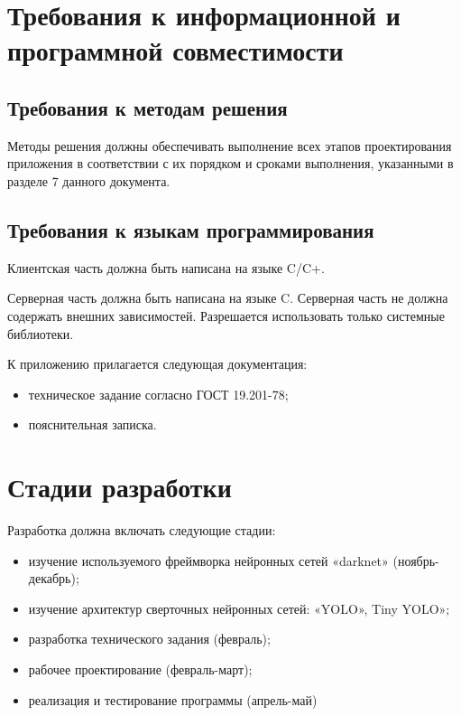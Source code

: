 \documentclass[a4paper,english]{G2-105}
\begin{document}
\section{Требования к информационной и программной совместимости}\ttl \ttl
\subsection{Требования к методам решения} \ttl
\par Методы решения должны обеспечивать выполнение всех этапов проектирования приложения в соответствии с их порядком и сроками выполнения, указанными в разделе 7 данного документа.
\ttl 
\subsection{Требования к языкам программирования} \ttl
\par Клиентская часть должна быть написана на языке C/C+.
\par Серверная часть должна быть написана на языке C. Серверная часть не должна содержать внешних зависимостей. Разрешается использовать только системные библиотеки.

\par К приложению прилагается следующая документация:
\begin{itemize}
\item техническое задание согласно ГОСТ 19.201-78;
\item пояснительная записка.
\end{itemize}
\ttl \ttl \ttl
{} \ttl \ttl
\section{Стадии разработки} \ttl
\par Разработка должна включать следующие стадии:
\begin{itemize}
\item изучение используемого фреймворка нейронных сетей
«darknet» (ноябрь-декабрь);
\item изучение архитектур сверточных нейронных сетей: «YOLO»,
Tiny YOLO»;
\item разработка технического задания (февраль);
\item рабочее проектирование (февраль-март);
\item реализация и тестирование программы (апрель-май)
\end{itemize}
\ttl
\end{document}
